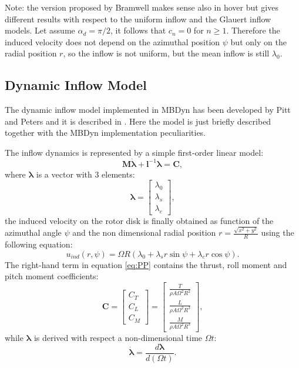 Note: the version proposed by Bramwell \cite{BRAMWELL-1976}
makes sense also in hover but gives different
results with respect to the uniform inflow and the Glauert inflow models.
Let assume $\alpha_d = \pi/2$, it follows that $c_n = 0$ for $n \ge 1$.
Therefore the induced velocity does not depend on the azimuthal position 
$\psi$ but only on the radial position $r$, so the inflow is not uniform, 
but the mean inflow is still $\lambda_0$.

\subsection{Dynamic Inflow Model}

The dynamic inflow model implemented in MBDyn has been developed by Pitt
and Peters and it is described in \cite{PITT}. 
Here the model is just briefly described together with the MBDyn implementation
peculiarities. 

The inflow dynamics is represented by a simple first-order linear model: 
\begin{equation}\label{eq:PP}
\mathbf{M} \boldsymbol{\dot{\lambda}} + \mathbf{l}^{-1} \boldsymbol{\lambda} =
 \mathbf{C},
\end{equation}
where $\boldsymbol{\lambda}$ is a vector with 3 elements:
\begin{equation}
\boldsymbol{\lambda} = 
\left[ 
\begin{array}{c}
\lambda_0 \\
\lambda_s \\
\lambda_c
\end{array}
\right],
\end{equation}
the induced velocity on the rotor disk is finally obtained as 
function of the azimuthal angle $\psi$ and the non dimensional
radial position $r = \frac{\sqrt{x^2 + y^2}}{R}$ using the
following equation:
\begin{equation}
u_{ind}(r, \psi) = \Omega R ( \lambda_0 + \lambda_s r \sin{\psi} +
\lambda_c r \cos{\psi} ).
\end{equation}
The right-hand term in equation \ref{eq:PP} contains the thrust,
roll moment and pitch moment coefficients:
\begin{equation}
\mathbf{C} = \left[
\begin{array}{c}
C_T \\
C_L \\
C_M 
\end{array}
\right] = \left[
\begin{array}{c}
\frac{T}{\rho A \Omega^2 R^2} \\
\frac{L}{\rho A \Omega^2 R^3} \\
\frac{M}{\rho A \Omega^2 R^3} 
\end{array}
\right],
\end{equation}
while $\boldsymbol{\lambda}$ is derived with respect a non-dimensional
time $\Omega t$:
\begin{equation}
\boldsymbol{\dot{\lambda}} = \frac{ d \boldsymbol{\lambda}}{ d (\Omega t)}.
\end{equation}

